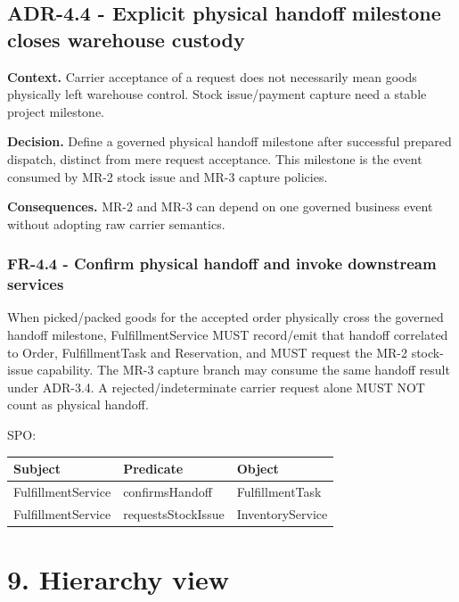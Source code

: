 \documentclass[
  10pt,
]{article}
\begin{document}
\subsection{ADR-4.4 - Explicit physical handoff milestone closes
warehouse
custody}\label{adr-44---explicit-physical-handoff-milestone-closes-warehouse-custody}

\textbf{Context.} Carrier acceptance of a request does not necessarily
mean goods physically left warehouse control. Stock issue/payment
capture need a stable project milestone.

\textbf{Decision.} Define a governed physical handoff milestone after
successful prepared dispatch, distinct from mere request acceptance.
This milestone is the event consumed by MR-2 stock issue and MR-3
capture policies.

\textbf{Consequences.} MR-2 and MR-3 can depend on one governed business
event without adopting raw carrier semantics.

\subsubsection{FR-4.4 - Confirm physical handoff and invoke downstream
services}\label{fr-44---confirm-physical-handoff-and-invoke-downstream-services}

When picked/packed goods for the accepted order physically cross the
governed handoff milestone, FulfillmentService MUST record/emit that
handoff correlated to Order, FulfillmentTask and Reservation, and MUST
request the MR-2 stock-issue capability. The MR-3 capture branch may
consume the same handoff result under ADR-3.4. A rejected/indeterminate
carrier request alone MUST NOT count as physical handoff.

SPO:

\begin{longtable}[]{@{}lll@{}}
\toprule\noalign{}
Subject & Predicate & Object \\
\midrule\noalign{}
\endhead
\bottomrule\noalign{}
\endlastfoot
FulfillmentService & confirmsHandoff & FulfillmentTask \\
FulfillmentService & requestsStockIssue & InventoryService \\
\end{longtable}

\section{9. Hierarchy view}\label{9-hierarchy-view}
\end{document}
